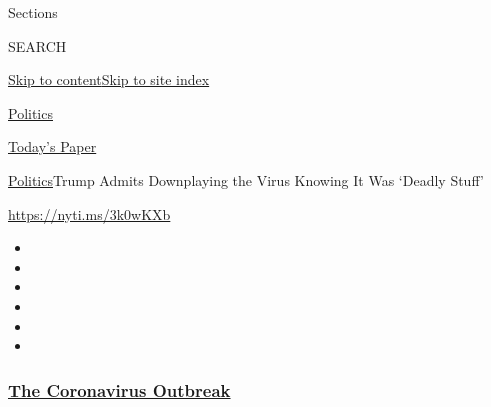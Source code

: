 Sections

SEARCH

\protect\hyperlink{site-content}{Skip to
content}\protect\hyperlink{site-index}{Skip to site index}

\href{https://www.nytimes3xbfgragh.onion/section/politics}{Politics}

\href{https://myaccount.nytimes3xbfgragh.onion/auth/login?response_type=cookie\&client_id=vi}{}

\href{https://www.nytimes3xbfgragh.onion/section/todayspaper}{Today's
Paper}

\href{/section/politics}{Politics}\textbar{}Trump Admits Downplaying the
Virus Knowing It Was `Deadly Stuff'

\url{https://nyti.ms/3k0wKXb}

\begin{itemize}
\item
\item
\item
\item
\item
\item
\end{itemize}

\hypertarget{the-coronavirus-outbreak}{%
\subsubsection{\texorpdfstring{\href{https://www.nytimes3xbfgragh.onion/news-event/coronavirus?name=styln-coronavirus-national\&region=TOP_BANNER\&block=storyline_menu_recirc\&action=click\&pgtype=Article\&impression_id=88f93120-f52c-11ea-8c5a-0b503289d8d2\&variant=undefined}{The
Coronavirus
Outbreak}}{The Coronavirus Outbreak}}\label{the-coronavirus-outbreak}}

